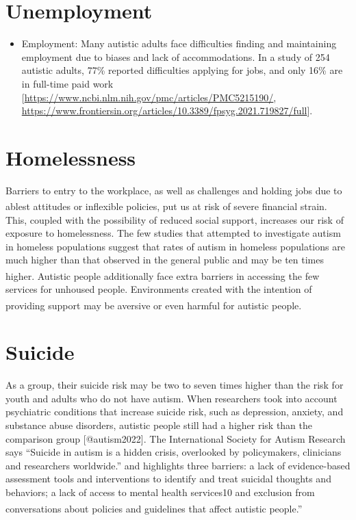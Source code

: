 \documentclass[
  letterpaper,
  DIV=11,
  numbers=noendperiod]{scrreprt}
\providecommand{\tightlist}{%
  \setlength{\itemsep}{0pt}\setlength{\parskip}{0pt}}\usepackage{longtable,booktabs,array}
\begin{document}
\section{Unemployment}\label{sec-unemployment}

\begin{itemize}
\tightlist
\item
  Employment: Many autistic adults face difficulties finding and
  maintaining employment due to biases and lack of accommodations. In a
  study of 254 autistic adults, 77\% reported difficulties applying for
  jobs, and only 16\% are in full-time paid work
  {[}\url{https://www.ncbi.nlm.nih.gov/pmc/articles/PMC5215190/},
  \url{https://www.frontiersin.org/articles/10.3389/fpsyg.2021.719827/full}{]}.
\end{itemize}

\section{Homelessness}\label{sec-homelessness}

Barriers to entry to the workplace, as well as challenges and holding
jobs due to ablest attitudes or inflexible policies, put us at risk of
severe financial strain\textsuperscript{}.
This, coupled with the possibility of reduced social support, increases
our risk of exposure to homelessness. The few studies that attempted to
investigate autism in homeless populations suggest that rates of autism
in homeless populations are much higher than that observed in the
general public and may be ten times
higher\textsuperscript{}. Autistic
people additionally face extra barriers in accessing the few services
for unhoused people. Environments created with the intention of
providing support may be aversive or even harmful for autistic
people\textsuperscript{}.

\section{Suicide}\label{sec-suicide}

As a group, their suicide risk may be two to seven times higher than the
risk for youth and adults who do not have autism. When researchers took
into account psychiatric conditions that increase suicide risk, such as
depression, anxiety, and substance abuse disorders, autistic people
still had a higher risk than the comparison group
{[}@\textbar autism2022{]}. The International Society for Autism
Research says ``Suicide in autism is a hidden crisis, overlooked by
policymakers, clinicians and researchers worldwide.'' and highlights
three barriers: a lack of evidence-based assessment tools and
interventions to identify and treat suicidal thoughts and behaviors; a
lack of access to mental health services10 and exclusion from
conversations about policies and guidelines that affect autistic
people.''\textsuperscript{}
\end{document}

